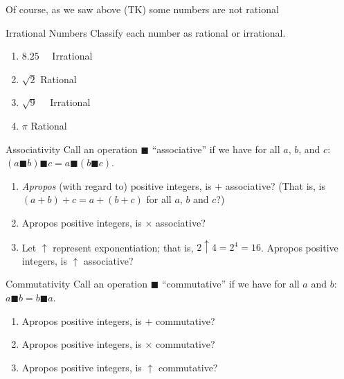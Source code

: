 \documentclass[a4paper,10pt]{report}
\begin{document}
Of course, as we saw above (TK) some numbers are not rational

\begin{problem}{Irrational Numbers}
 Classify each number as rational or irrational.

 \begin{enumerate}[\hspace{.5cm}a.]
  \item $8.25$ \hfill {}~~Irrational
  \item $\sqrt{2}$ \hfill Rational~~
  \item $\sqrt{9}$ \hfill {}~~Irrational
  \item $\pi$ \hfill Rational~~
 \end{enumerate}
\end{problem}

\begin{problem}{Associativity}
 Call an operation $\blacksquare$ ``associative'' if we have for all $a$, $b$,
 and $c$: $(a \blacksquare b) \blacksquare c = a \blacksquare (b \blacksquare
 c)$.

 \begin{enumerate}[\hspace{.5cm}a.]
  \item \emph{Apropos} (with regard to) positive integers, is $+$ associative?
  (That is, is $(a+b)+c=a+(b+c)$ for all $a$, $b$ and $c$?) 
  \item Apropos positive integers, is $\times$ associative? 
  \item Let $\uparrow$ represent exponentiation; that is, $2\uparrow4=2^4=16$.
  Apropos positive integers, is $\uparrow$ associative? 
 \end{enumerate}
\end{problem}

\begin{problem}{Commutativity}
 Call an operation $\blacksquare$ ``commutative'' if we have for all $a$ and
 $b$: $a \blacksquare b = b \blacksquare a$.

 \begin{enumerate}[\hspace{.5cm}a.]
  \item Apropos positive integers, is $+$ commutative? 
  \item Apropos positive integers, is $\times$ commutative? 
  \item Apropos positive integers, is $\uparrow$ commutative? 
 \end{enumerate}
\end{problem}
\end{document}
